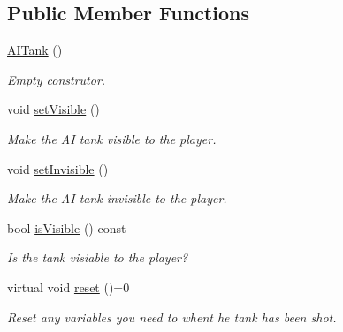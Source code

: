 \subsection*{Public Member Functions}
\begin{DoxyCompactItemize}
\item 
\mbox{\label{class_a_i_tank_a39ad2a5462879c2322fb737e89e60336}} 
\mbox{\hyperlink{class_a_i_tank_a39ad2a5462879c2322fb737e89e60336}{A\+I\+Tank}} ()
\begin{DoxyCompactList}\small\item\em Empty construtor. \end{DoxyCompactList}\item 
\mbox{\label{class_a_i_tank_ac81044895eba1a592475969c72061333}} 
void \mbox{\hyperlink{class_a_i_tank_ac81044895eba1a592475969c72061333}{set\+Visible}} ()
\begin{DoxyCompactList}\small\item\em Make the AI tank visible to the player. \end{DoxyCompactList}\item 
\mbox{\label{class_a_i_tank_a3c7f8e031ea59a6441c95c60c78563f0}} 
void \mbox{\hyperlink{class_a_i_tank_a3c7f8e031ea59a6441c95c60c78563f0}{set\+Invisible}} ()
\begin{DoxyCompactList}\small\item\em Make the AI tank invisible to the player. \end{DoxyCompactList}\item 
\mbox{\label{class_a_i_tank_a1b21341fbc8cc144425742b162a536fe}} 
bool \mbox{\hyperlink{class_a_i_tank_a1b21341fbc8cc144425742b162a536fe}{is\+Visible}} () const
\begin{DoxyCompactList}\small\item\em Is the tank visiable to the player? \end{DoxyCompactList}\item 
\mbox{\label{class_a_i_tank_a0a4cb4af6e15d7db0cd2e3ac1ddbd236}} 
virtual void \mbox{\hyperlink{class_a_i_tank_a0a4cb4af6e15d7db0cd2e3ac1ddbd236}{reset}} ()=0
\begin{DoxyCompactList}\small\item\em Reset any variables you need to whent he tank has been shot. \end{DoxyCompactList}\item 

\end{DoxyCompactItemize}
